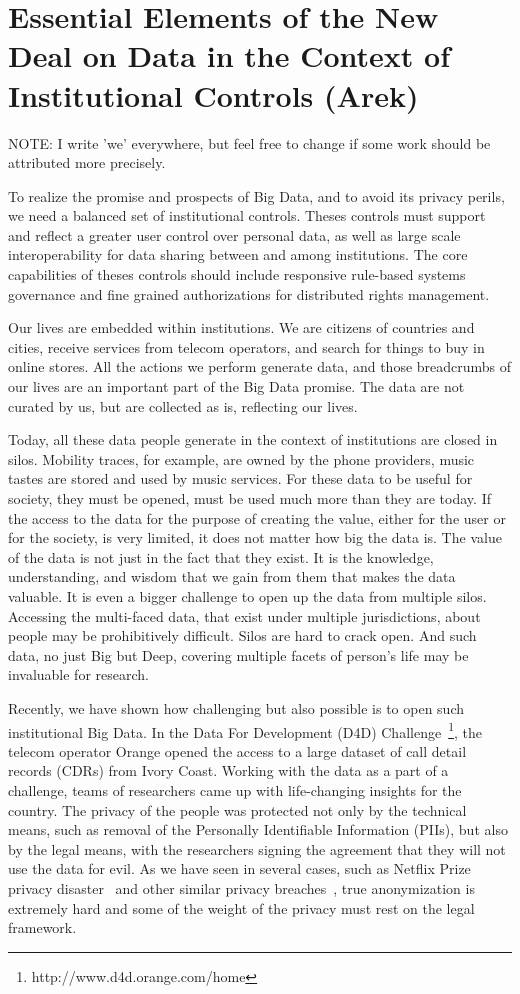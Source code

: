 \section{Essential Elements of the New Deal on Data in the Context of Institutional Controls (Arek)}

NOTE: I write 'we' everywhere, but feel free to change if some work should be attributed more precisely.

To realize the promise and prospects of Big Data, and to avoid its privacy perils, we need a balanced set of institutional controls.
Theses controls must support and reflect a greater user control over personal data, as well as large scale interoperability for data sharing between and among institutions.
The core capabilities of theses controls should include responsive rule-based systems governance and fine grained authorizations for distributed rights management.

Our lives are embedded within institutions. 
We are citizens of countries and cities, receive services from telecom operators, and search for things to buy in online stores. 
All the actions we perform generate data, and those breadcrumbs of our lives are an important part of the Big Data promise.
The data are not curated by us, but are collected as is, reflecting our lives.

Today, all these data people generate in the context of institutions are closed in silos. 
Mobility traces, for example, are owned by the phone providers, music tastes are stored and used by music services.
For these data to be useful for society, they must be opened, must be used much more than they are today.
If the access to the data for the purpose of creating the value, either for the user or for the society, is very limited, it does not matter how big the data is. 
The value of the data is not just in the fact that they exist.
It is the knowledge, understanding, and wisdom that we gain from them that makes the data valuable.  
It is even a bigger challenge to open up the data from multiple silos.
Accessing the multi-faced data, that exist under multiple jurisdictions, about people may be prohibitively difficult.
Silos are hard to crack open.
And such data, no just Big but Deep, covering multiple facets of person's life may be invaluable for research.

Recently, we have shown how challenging but also possible is to open such institutional Big Data.
In the Data For Development (D4D) Challenge~\footnote{http://www.d4d.orange.com/home}, the telecom operator Orange opened the access to a large dataset of call detail records (CDRs) from Ivory Coast.
Working with the data as a part of a challenge, teams of researchers came up with life-changing insights for the country. 
The privacy of the people was protected not only by the technical means, such as removal of the Personally Identifiable Information (PIIs), but also by the legal means, with the researchers signing the agreement that they will not use the data for evil.
As we have seen in several cases, such as Netflix Prize privacy disaster~\cite{narayanan2008robust} and other similar privacy breaches~\cite{sweeney2000simple}, true anonymization is extremely hard and some of the weight of the privacy must rest on the legal framework.

